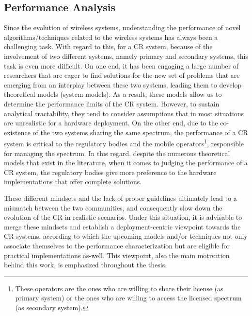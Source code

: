 \subsection{Performance Analysis}
Since the evolution of wireless systems, understanding the performance of novel algorithms/techniques related to the wireless systems has always been a challenging task. With regard to this, for a CR system, because of the involvement of two different systems, namely primary and secondary systems, this task is even more difficult. On one end, it has been engaging a large number of researchers that are eager to find solutions for the new set of problems that are emerging from an interplay between these two systems, leading them to develop theoretical models (system models). As a result, these models allow us to determine the performance limits of the CR system. However, to sustain analytical tractability, they tend to consider assumptions that in most situations are unrealistic for a hardware deployment.  %
 On the other end, due to the co-existence of the two systems sharing the same spectrum, the performance of a CR system is critical to the regulatory bodies and the mobile operators\footnote{These operators are the ones who are willing to share their license (as primary system) or the ones who are willing to access the licensed spectrum (as secondary system).}, responsible for managing the spectrum. In this regard, despite the numerous theoretical models that exist in the literature, when it comes to judging the performance of a CR system, the regulatory bodies give more preference to the hardware implementations that offer complete solutions. 

These different mindsets and the lack of proper guidelines ultimately lead to a mismatch between the two communities, and consequently slow down the evolution of the CR in realistic scenarios. Under this situation, it is advisable to merge these mindsets and establish a deployment-centric viewpoint towards the CR systems, according to which the upcoming models and/or techniques not only associate themselves to the performance characterization but are eligible for practical implementations as-well. This viewpoint, also the main motivation behind this work, is emphasized throughout the thesis. 


